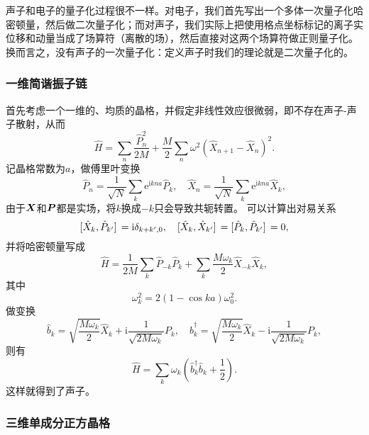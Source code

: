 \documentclass[hyperref, UTF8, a4paper]{ctexart}
\newcommand*{\ii}{\mathrm{i}}
\newcommand*{\ee}{\mathrm{e}}
\begin{document}
声子和电子的量子化过程很不一样。对电子，我们首先写出一个多体一次量子化哈密顿量，然后做二次量子化；而对声子，我们实际上把使用格点坐标标记的离子实位移和动量当成了场算符（离散的场），然后直接对这两个场算符做正则量子化。
换而言之，没有声子的一次量子化：定义声子时我们的理论就是二次量子化的。

\subsubsection{一维简谐振子链}

首先考虑一个一维的、均质的晶格，并假定非线性效应很微弱，即不存在声子-声子散射，从而
\begin{equation}
    \hat{H} = \sum_n \frac{\hat{P}_n^2}{2 M} + \frac{M}{2} \sum_{n} \omega^2 (\hat{X}_{n+1} - \hat{X}_{n})^2.
    \label{eq:one-dim-osc-hamiltonian}
\end{equation}
记晶格常数为$a$，做傅里叶变换
\[
    \hat{P}_n = \frac{1}{\sqrt{N}} \sum_{k} \ee^{\ii k n a} \hat{P}_k, \quad \hat{X}_n = \frac{1}{\sqrt{N}} \sum_{k} \ee^{\ii k n a} \hat{X}_k,
\]
由于$\vb*{X}$和$\vb*{P}$都是实场，将$k$换成$-k$只会导致共轭转置。
可以计算出对易关系
\begin{equation}
    \comm*{\hat{X}_{k}}{\hat{P}_{k'}} = \ii \delta_{k+k', 0}, \quad \comm*{\hat{X}_{k}}{\hat{X}_{k'}} = \comm*{\hat{P}_{k}}{\hat{P}_{k'}} = 0,
\end{equation}
并将哈密顿量写成
\[
    \hat{H} = \frac{1}{2M} \sum_{k} \hat{P}_{-k} \hat{P}_{k} + \sum_k \frac{M \omega_{k}}{2} \hat{X}_{-k} \hat{X}_k,
\]
其中
\begin{equation}
    \omega_k^2 = 2 (1 - \cos k a) \omega_0^2.
\end{equation}
做变换
\begin{equation}
    \hat{b}_{k} = \sqrt{\frac{M \omega_k}{2}} \hat{X}_k + \ii \frac{1}{\sqrt{2 M \omega_k}} P_k, \quad \hat{b}^\dagger_{k} = \sqrt{\frac{M \omega_k}{2}} \hat{X}_k - \ii \frac{1}{\sqrt{2 M \omega_k}} P_k,
\end{equation}
则有
\begin{equation}
    \hat{H} = \sum_k \omega_k \left(\hat{b}^\dagger_k \hat{b}_k + \frac{1}{2}\right).
\end{equation}
这样就得到了声子。

\subsubsection{三维单成分正方晶格}
\end{document}
